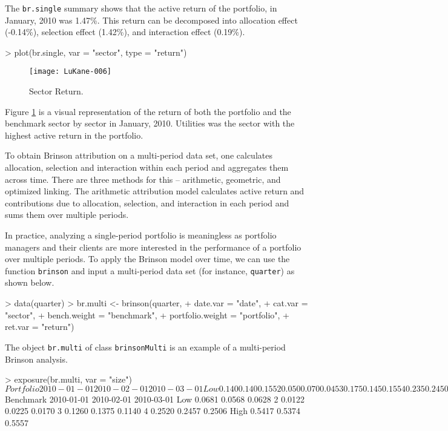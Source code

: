 The \texttt{br.single} summary shows that the active return of the
portfolio, in January, 2010 was 1.47\%. This return can be decomposed
into allocation effect (-0.14\%), selection effect (1.42\%), and
interaction effect (0.19\%).
\begin{smallverbatim}
> plot(br.single, var = "sector", type = "return")
\end{smallverbatim}
\begin{figure}
\centering
\vspace*{.1in}
\texttt{[image: LuKane-006]}
\caption{\label{figure:return}
  Sector Return.}
\end{figure}

Figure \ref{figure:return} is a visual representation of the return of
both the portfolio and the benchmark sector by sector in January,
2010. Utilities was the
sector with the highest active return in the portfolio.

To obtain Brinson attribution on a multi-period data set, one
calculates allocation, selection and interaction within each period
and aggregates them across time. There are three methods for this --
arithmetic, geometric, and optimized linking. The arithmetic attribution model
calculates active return and contributions due to allocation,
selection, and interaction in each period and sums them over multiple
periods. 

In practice, analyzing a single-period portfolio is meaningless as
portfolio managers and their clients are more interested in the
performance of a portfolio over multiple periods. To apply the Brinson
model over time, we can use the function \texttt{brinson} and input a
multi-period data set (for instance, \texttt{quarter}) as shown
below. 

\begin{smallverbatim}
> data(quarter)
> br.multi <- brinson(quarter,
+           date.var = "date",
+           cat.var = "sector",
+           bench.weight = "benchmark",
+           portfolio.weight = "portfolio",
+           ret.var = "return")
\end{smallverbatim}
The object \texttt{br.multi} of class \texttt{brinsonMulti} is an
example of a multi-period Brinson analysis.
\begin{smallverbatim}
> exposure(br.multi, var = "size")
$Portfolio
     2010-01-01 2010-02-01 2010-03-01
Low       0.140      0.140      0.155
2         0.050      0.070      0.045
3         0.175      0.145      0.155
4         0.235      0.245      0.240
High      0.400      0.400      0.405

$Benchmark
     2010-01-01 2010-02-01 2010-03-01
Low      0.0681     0.0568     0.0628
2        0.0122     0.0225     0.0170
3        0.1260     0.1375     0.1140
4        0.2520     0.2457     0.2506
High     0.5417     0.5374     0.5557
\end{smallverbatim}

